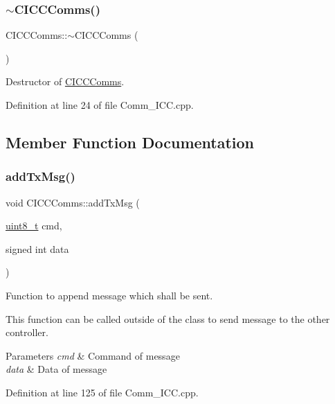 \subsubsection{\texorpdfstring{$\sim$\+C\+I\+C\+C\+Comms()}{~CICCComms()}}
{\footnotesize\ttfamily C\+I\+C\+C\+Comms\+::$\sim$\+C\+I\+C\+C\+Comms (\begin{DoxyParamCaption}{ }\end{DoxyParamCaption})}



Destructor of \mbox{\hyperlink{class_c_i_c_c_comms}{C\+I\+C\+C\+Comms}}. 



Definition at line 24 of file Comm\+\_\+\+I\+C\+C.\+cpp.



\subsection{Member Function Documentation}
\mbox{\label{class_c_i_c_c_comms_ab925dd7ff82f30ccd9f770ab2281b3ab}} 
\subsubsection{\texorpdfstring{add\+Tx\+Msg()}{addTxMsg()}}
{\footnotesize\ttfamily void C\+I\+C\+C\+Comms\+::add\+Tx\+Msg (\begin{DoxyParamCaption}\item[{\mbox{\hyperlink{_a_d_a_s___types_8h_aba7bc1797add20fe3efdf37ced1182c5}{uint8\+\_\+t}}}]{cmd,  }\item[{signed int}]{data }\end{DoxyParamCaption})\hspace{0.3cm}{\ttfamily [virtual]}}



Function to append message which shall be sent. 

This function can be called outside of the class to send message to the other controller. 
\begin{DoxyParams}{Parameters}
{\em cmd} & Command of message \\
\hline
{\em data} & Data of message \\
\hline
\end{DoxyParams}


Definition at line 125 of file Comm\+\_\+\+I\+C\+C.\+cpp.

